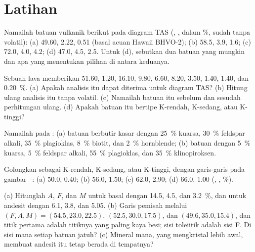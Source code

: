 \section{Latihan}

\begin{exercise}[$\star$]\label{exo:b2:magmatic-series:1}
Namailah batuan vulkanik berikut pada diagram TAS (, , 
dalam \unit{\percent}, sudah tanpa volatil): (a) 49.60, 2.22, 0.51 (basal
acuan Hawaii BHVO-2); (b) 58.5, 3.9, 1.6; (c) 72.0, 4.0, 4.2; (d) 47.0, 4.5, 2.5.
Untuk (d), sebutkan dua batuan yang mungkin dan apa yang menentukan pilihan di antara keduanya.
\end{exercise}

\begin{exercise}[$\star$]\label{exo:b2:magmatic-series:2}
Sebuah lava memberikan  51.60,  1.20,  16.10,  9.80,
 6.60,  8.20,  3.50,  1.40,  1.40, dan
 \qty{0.20}{\percent}. (a) Apakah analisis itu dapat diterima untuk diagram TAS?
(b) Hitung ulang analisis itu tanpa volatil. (c) Namailah batuan itu sebelum dan sesudah
perhitungan ulang. (d) Apakah batuan itu bertipe K-rendah, K-sedang, atau K-tinggi?
\end{exercise}

\begin{exercise}[$\star$]\label{exo:b2:magmatic-series:3}
Namailah pada : (a) batuan berbutir kasar dengan \qty{25}{\percent} kuarsa,
\qty{30}{\percent} feldspar alkali, \qty{35}{\percent} plagioklas, \qty{8}{\percent}
biotit, dan \qty{2}{\percent} hornblende; (b) batuan dengan \qty{5}{\percent} kuarsa,
\qty{5}{\percent} feldspar alkali, \qty{55}{\percent} plagioklas, dan
\qty{35}{\percent} klinopiroksen.
\end{exercise}

\begin{exercise}[$\star$]\label{exo:b2:magmatic-series:4}
Golongkan sebagai K-rendah, K-sedang, atau K-tinggi, dengan garis-garis pada gambar --:
(a) 50.0, 0.40; (b) 56.0, 1.50; (c) 62.0, 2.90; (d) 66.0, 1.00 (,
, \unit{\percent}).
\end{exercise}

\begin{exercise}[$\star\star$]\label{exo:b2:magmatic-series:5}
(a) Hitunglah $A$, $F$, dan $M$ untuk basal dengan  14.5,  4.5, dan
 \qty{3.2}{\percent}, dan untuk andesit dengan 6.1, 3.8, dan 5.05.
(b) Garis pemisah melalui $(F, A, M) = (54.5, 23.0, 22.5)$, $(52.5, 30.0,
17.5)$, dan $(49.6, 35.0, 15.4)$, dan titik pertama adalah titiknya yang paling kaya besi;
sisi toleiitik adalah sisi F. Di sisi mana setiap batuan jatuh? (c) Mineral
mana, yang mengkristal lebih awal, membuat andesit itu tetap berada di tempatnya?
\end{exercise}

